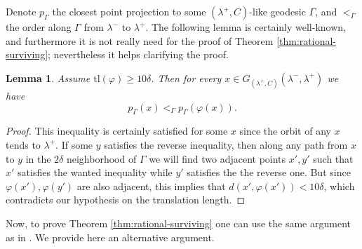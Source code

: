 \documentclass{amsart}
\newtheorem{lemma}[thm]{Lemma}
\theoremstyle{definition}
\begin{document}
Denote $p_\Gamma$ the closest point projection to some \((\lambda^+,C)\)-like geodesic $\Gamma$, and $<_\Gamma$ the order along $\Gamma$ from $\lambda^-$ to $\lambda^+$. The following lemma is certainly well-known, and furthermore it is not really need for the proof of Theorem \ref{thm:rational-surviving}; nevertheless it helps clarifying the proof.
\begin{lemma}\label{lem:order}
Assume $\mathrm{tl}(\varphi) \geq 10 \delta$. 
Then for every $x \in G_{(\lambda^+,C)}(\lambda^-,\lambda^+)$ we have 
\[
p_\Gamma (x) <_\Gamma p_\Gamma (\varphi(x)).
\]
\end{lemma}
\begin{proof}
This inequality is certainly satisfied for some $x$ since the orbit of any $x$ tends to $\lambda^+$. If some $y$ satisfies the reverse inequality, then along any path from $x$ to $y$ in the $2\delta$ neighborhood of $\Gamma$ we will find two adjacent points $x', y'$ such that $x'$ satisfies the wanted inequality while $y'$ satisfies the the reverse one. But since $\varphi(x'), \varphi(y')$ are also adjacent, this implies that $d(x', \varphi (x')) < 10\delta$, which contradicts our hypothesis on the translation length.
\end{proof}

Now, to prove Theorem \ref{thm:rational-surviving} one can use the same argument as in \cite[Lemma 3.4 and Corollary 3.5]{bowditch_tight}. We provide here an alternative argument.
\end{document}
